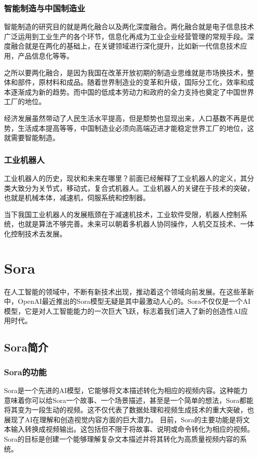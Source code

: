 \documentclass[12pt,a4paper,oneside]{article}
\begin{document}
\subsubsection{智能制造与中国制造业}
智能制造的研究目的就是两化融合以及两化深度融合。两化融合就是电子信息技术广泛运用到工业生产的各个环节，信息化再成为工业企业经营管理的常规手段。深度融合就是在两化的基础上，在关键领域进行深化提升，比如新一代信息技术应用，产品信息化等等。

之所以要两化融合，是因为我国在改革开放初期的制造业思维就是市场换技术，整体和部件，原材料和成品。随着世界制造业的变革和升级，国际分工化，效率和成本逐渐成为新的趋势。而中国的低成本劳动力和政府的全力支持也奠定了中国世界工厂的地位。

经济发展虽然带动了人民生活水平提高，但是颓势也显现出来，人口基数不再是优势，生活成本提高等等，中国制造业必须向高端迈进才能稳定世界工厂的地位，这就需要智能制造。

\subsubsection{工业机器人}
工业机器人的历史，现状和未来在哪里？前面已经解释了工业机器人的定义，其分类大致分为关节式，移动式，复合式机器人。工业机器人的关键在于技术的突破，也就是机械本体，减速机，伺服系统和控制器。

当下我国工业机器人的发展瓶颈在于减速机技术，工业软件受限，机器人控制系统，也就是算法不够完善。未来可以朝着多机器人协同操作，人机交互技术、一体化控制技术去发展。
\section{Sora}
在人工智能的领域中，不断有新技术出现，推动着这个领域向前发展。在这些革新中，OpenAI最近推出的Sora模型无疑是其中最激动人心的。Sora不仅仅是一个AI模型，它是对人工智能能力的一次巨大飞跃，标志着我们进入了新的创造性AI应用时代。
\subsection{Sora简介}
\subsubsection{Sora的功能}
Sora是一个先进的AI模型，它能够将文本描述转化为相应的视频内容。这种能力意味着你可以给Sora一个故事、一个场景描述，甚至是一个简单的想法，Sora都能将其变为一段生动的视频。这不仅代表了数据处理和视频生成技术的重大突破，也展现了AI在理解和创造视觉内容方面的巨大潜力。
目前，Sora的主要功能是将文本输入转换成视频输出。这包括但不限于将故事、说明或命令转化为相应的视频。Sora的目标是创建一个能够理解复杂文本描述并将其转化为高质量视频内容的系统。
\end{document}
